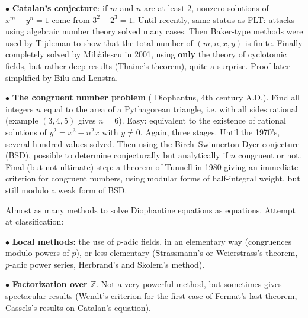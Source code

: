 \documentclass[10pt,a4]{seminar}
\newcommand{\Z}{{\mathbb{Z}}}
\newcommand{\ctl}{\centerline}
\newcommand{\myblue}{\red}
\begin{document}
\begin{slide}
\ctl{\large{}\myblue{\sc Examples (II)}}

\medskip

{\red $\bullet$} {\bf Catalan's conjecture}: if {\blue $m$} and {\blue
  $n$} are at least {\blue $2$}, nonzero solutions of {\blue $x^m-y^n=1$} come
  from {\blue $3^2-2^3=1$}. Until recently, same status as FLT:
  attacks using algebraic number theory solved many cases. Then
{\red Baker}-type methods were used by {\red Tijdeman} to show that
  the total number of {\blue $(m,n,x,y)$} is finite. Finally
  completely solved by {\red Mih\u{a}ilescu} in 2001, using {\bf only}
  the theory of {\red cyclotomic fields}, but rather deep results
({\red Thaine's theorem}), quite a surprise. Proof later simplified by
  {\red Bilu} and {\red Lenstra}.


\end{slide}
\begin{slide}
\ctl{\large{}\myblue{\sc Examples (III)}}

\medskip

{\red $\bullet$} {\bf The congruent number problem} ({\red
  Diophantus}, 4th century A.D.). Find all integers {\blue $n$} equal
  to the area of a {\red Pythagorean triangle}, i.e. with all sides
  rational (example {\blue $(3,4,5)$} gives {\blue $n=6$}). Easy:
  equivalent to the existence of {\red rational} solutions of
{\blue $y^2=x^3-n^2x$} with {\blue $y\ne0$}. Again, three
  stages. Until the 1970's, several hundred values solved. Then using
the {\red Birch--Swinnerton Dyer conjecture (BSD)}, possible to determine
{\red conjecturally} but {\red analytically} if {\blue $n$} congruent
  or not. Final (but not ultimate) step: a theorem of {\red Tunnell}
  in 1980 giving an immediate criterion for congruent numbers, using
{\red modular forms of half-integral weight}, but still modulo a weak
  form of BSD.

\end{slide}
\begin{slide}
\ctl{\large{}\myblue{\sc Tools (I)}}

\medskip

Almost as many methods to solve Diophantine equations as equations. Attempt at
classification:

{\red $\bullet$} {\bf Local methods:} the use of {\blue $p$}-adic fields, in an 
elementary way (congruences modulo powers of {\blue $p$}), or less elementary 
({\red Strassmann's} or {\red Weierstrass's} theorem, {\blue $p$}-adic power 
series, {\red Herbrand's} and {\red Skolem's} method).

\smallskip

{\red $\bullet$} {\bf Factorization over {\blue $\Z$}}. Not a very powerful 
method, but sometimes gives spectacular results ({\red Wendt's criterion} for 
the first case of Fermat's last theorem, {\red Cassels's} results on 
{\red Catalan's equation}).

\end{slide}
\end{document}
